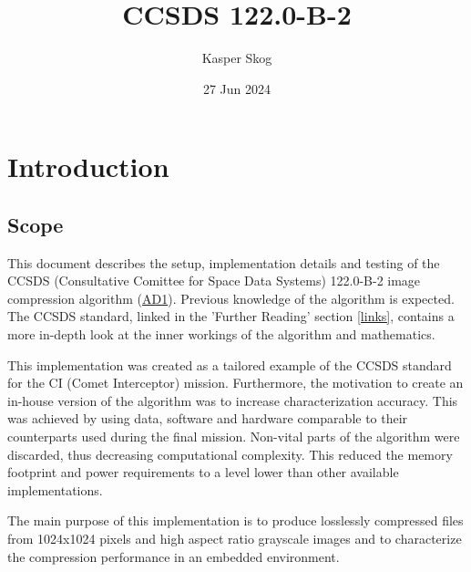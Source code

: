 \documentclass[12pt, a4paper]{article}
\title{CCSDS 122.0-B-2}
\author{Kasper Skog}
\date{27 Jun 2024}
\begin{document}
\maketitle
\newpage
\tableofcontents

\newpage
\section{Introduction}

\subsection{Scope}
This document describes the setup, implementation details and testing of the 
CCSDS (Consultative Comittee for Space Data Systems) 122.0-B-2 image compression algorithm (\hyperref[lnk:1]{AD1}). 
Previous knowledge of the algorithm is expected. 
The CCSDS standard, linked in the 'Further Reading' section \ref{links}, 
contains a more in-depth look at the inner workings of the algorithm and mathematics.

\medskip
\noindent
This implementation was created as a tailored example of the CCSDS standard for the CI (Comet Interceptor) mission. 
Furthermore, the motivation to create an in-house version of the algorithm was to increase characterization accuracy. 
This was achieved by using data, software and hardware comparable to their counterparts used during the final mission. 
Non-vital parts of the algorithm were discarded, thus decreasing computational complexity. 
This reduced the memory footprint and power requirements to a level lower than other available implementations.

\medskip
\noindent
The main purpose of this implementation is to produce losslessly compressed files from 
1024x1024 pixels and high aspect ratio grayscale images and to characterize the compression performance in an embedded environment. 
\end{document}
